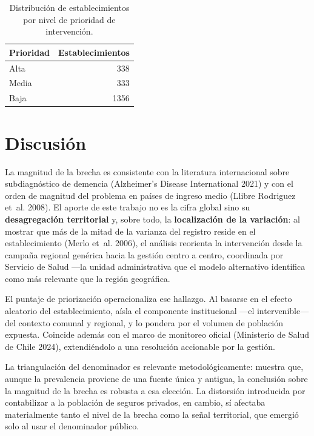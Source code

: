 \documentclass[
  spanish,
  letterpaper,
  DIV=11,
  numbers=noendperiod]{scrartcl}
\begin{document}
{

\begin{longtable}[]{@{}lr@{}}

\caption{\label{tbl-prio}Distribución de establecimientos por nivel de
prioridad de intervención.}

\tabularnewline

\toprule\noalign{}
Prioridad & Establecimientos \\
\midrule\noalign{}
\endhead
\bottomrule\noalign{}
\endlastfoot
Alta & 338 \\
Media & 333 \\
Baja & 1356 \\

\end{longtable}

}

\section{Discusión}\label{discusiuxf3n}

La magnitud de la brecha es consistente con la literatura internacional
sobre subdiagnóstico de demencia (Alzheimer's Disease International
2021) y con el orden de magnitud del problema en países de ingreso medio
({Llibre Rodriguez et~al.} 2008). El aporte de este trabajo no es la
cifra global sino su \textbf{desagregación territorial} y, sobre todo,
la \textbf{localización de la variación}: al mostrar que más de la mitad
de la varianza del registro reside en el establecimiento ({Merlo et~al.}
2006), el análisis reorienta la intervención desde la campaña regional
genérica hacia la gestión centro a centro, coordinada por Servicio de
Salud ---la unidad administrativa que el modelo alternativo identifica
como más relevante que la región geográfica.

El puntaje de priorización operacionaliza ese hallazgo. Al basarse en el
efecto aleatorio del establecimiento, aísla el componente institucional
---el intervenible--- del contexto comunal y regional, y lo pondera por
el volumen de población expuesta. Coincide además con el marco de
monitoreo oficial (Ministerio de Salud de Chile 2024), extendiéndolo a
una resolución accionable por la gestión.

La triangulación del denominador es relevante metodológicamente: muestra
que, aunque la prevalencia proviene de una fuente única y antigua, la
conclusión sobre la magnitud de la brecha es robusta a esa elección. La
distorsión introducida por contabilizar a la población de seguros
privados, en cambio, sí afectaba materialmente tanto el nivel de la
brecha como la señal territorial, que emergió solo al usar el
denominador público.
\end{document}
